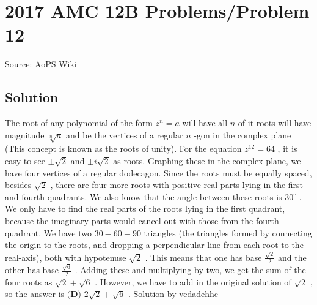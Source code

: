 \documentclass[12pt]{article}
\begin{document}
\section*{{2017 AMC 12B Problems/Problem 12}}
Source: AoPS Wiki

\subsection*{Solution}
The root of any polynomial of the form $z^n = a$ will have all $n$ of it roots will have magnitude $\sqrt[n]{a}$ and be the vertices of a regular $n$ -gon in the complex plane (This concept is known as the roots of unity). For the equation $z^{12} = 64$ , it is easy to see $\pm\sqrt{2}$ and $\pm {i} \sqrt{2}$ as roots. Graphing these in the complex plane, we have four vertices of a regular dodecagon. Since the roots must be equally spaced, besides $\sqrt{2}$ , there are four more roots with positive real parts lying in the first and fourth quadrants. We also know that the angle between these roots is $30^{\circ}$ . We only have to find the real parts of the roots lying in the first quadrant, because the imaginary parts would cancel out with those from the fourth quadrant. We have two $30-60-90$ triangles (the triangles formed by connecting the origin to the roots, and dropping a perpendicular line from each root to the real-axis), both with hypotenuse $\sqrt{2}$ . This means that one has base $\frac{\sqrt{2}}{2}$ and the other has base $\frac{\sqrt{6}}{2}$ . Adding these and multiplying by two, we get the sum of the four roots as $\sqrt{2} + \sqrt{6}$ . However, we have to add in the original solution of $\sqrt{2}$ , so the answer is $\boxed{\textbf{(D) }2\sqrt{2} + \sqrt{6}}$ . Solution by vedadehhc
\end{document}
